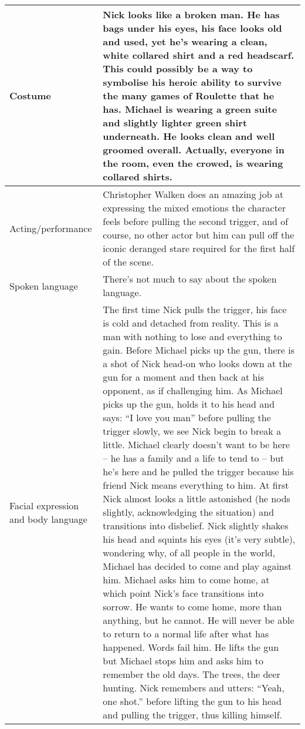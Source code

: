 \documentclass[notitlepage]{fhnwreport}
\begin{document}
\begin{center}
\begin{threeparttable}
	\begin{tabular}{p{4.2cm}p{11cm}}
		\midrule
		Costume &

Nick looks like a broken man. He has bags under  his  eyes, his face looks old
and used, yet he's wearing a  clean, white collared shirt and a red headscarf.
This  could possibly be a way to symbolise his heroic ability to  survive  the
many games of Roulette that he has. Michael  is  wearing  a  green  suite  and
slightly  lighter  green  shirt  underneath.  He  looks clean and well groomed
overall. Actually, everyone in  the room, even the crowed, is wearing collared
shirts. \\

		\midrule
		Acting/performance &

Christopher Walken does an amazing  job  at  expressing the mixed emotions the
character feels before pulling the second trigger,  and  of  course,  no other
actor but him can  pull  off  the iconic deranged stare required for the first
half of the scene. \\

		\midrule
		Spoken language & 

There's not much to say about the spoken language. \\

		\midrule
		Facial expression and body language &

The first time Nick pulls  the  trigger,  his  face  is cold and detached from
reality. This is a man with nothing to lose  and  everything  to  gain. Before
Michael picks up the  gun,  there  is a shot of Nick head-on who looks down at
the gun  for a moment and then back at his opponent, as if challenging him. As
Michael picks up the gun, holds it  to  his  head and says: ``I love you man''
before pulling the  trigger  slowly,  we  see  Nick  begin  to break a little.
Michael clearly doesn't want to be here -- he has a family and a life  to tend
to  --  but he's here and he pulled the trigger because his friend Nick  means
everything to him. At first Nick almost  looks  a  little  astonished (he nods
slightly, acknowledging the situation) and  transitions  into  disbelief. Nick
slightly shakes his head and squints his eyes  (it's  very  subtle), wondering
why, of all people in the world, Michael has decided to  come and play against
him. Michael asks him to come home,  at  which  point  Nick's face transitions
into sorrow. He wants to come home, more than anything, but he cannot. He will
never be able to return to a normal life after what has  happened.  Words fail
him. He lifts the gun but Michael stops him and asks him  to  remember the old
days. The trees, the  deer  hunting.  Nick  remembers  and utters: ``Yeah, one
shot.'' before lifting  the  gun  to  his  head  and pulling the trigger, thus
killing himself. \\

		\bottomrule
	\end{tabular}
\end{threeparttable}
\end{center}
\end{document}
